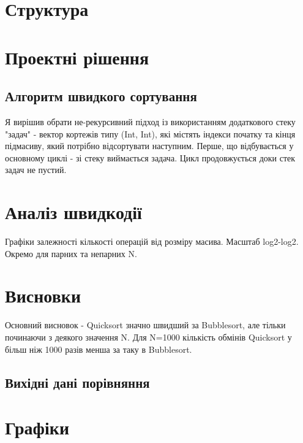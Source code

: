 \documentclass[11pt]{article}
\begin{document}
    

    \renewcommand*\contentsname{Зміст}
    \tableofcontents
    \newpage


    \section{Структура}


    \section{Проектні рішення}

    \subsection{Алгоритм швидкого сортування}
    Я вирішив обрати не-рекурсивний підход із використанням додаткового стеку "задач" -
    вектор кортежів типу (Int, Int), які містять індекси початку та кінця підмасиву,
    який потрібно відсортувати наступним.
    Перше, що відбувається у основному циклі - зі стеку виймається задача.
    Цикл продовжується доки стек задач не пустий.


    \section{Аналіз швидкодії}
    Графіки залежності кількості операцій від розміру масива.
    Масштаб log2-log2.
    Окремо для парних та непарних N.

    \section{Висновки}
    Основний висновок - Quicksort значно швидший за Bubblesort, але тільки починаючи з деякого значення N.
    Для N=1000 кількість обмінів Quicksort у більш ніж 1000 разів менша за таку в Bubblesort.

    \subsection{Вихідні дані порівняння}

    \section{Графіки}
\end{document}
